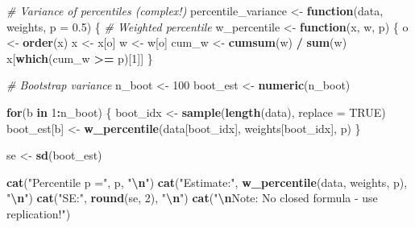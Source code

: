 \documentclass[
]{article}
\newenvironment{Shaded}{\begin{snugshade}}{\end{snugshade}}
\newcommand{\AttributeTok}[1]{\textcolor[rgb]{0.13,0.29,0.53}{#1}}
\newcommand{\CommentTok}[1]{\textcolor[rgb]{0.56,0.35,0.01}{\textit{#1}}}
\newcommand{\ConstantTok}[1]{\textcolor[rgb]{0.56,0.35,0.01}{#1}}
\newcommand{\ControlFlowTok}[1]{\textcolor[rgb]{0.13,0.29,0.53}{\textbf{#1}}}
\newcommand{\DecValTok}[1]{\textcolor[rgb]{0.00,0.00,0.81}{#1}}
\newcommand{\FloatTok}[1]{\textcolor[rgb]{0.00,0.00,0.81}{#1}}
\newcommand{\FunctionTok}[1]{\textcolor[rgb]{0.13,0.29,0.53}{\textbf{#1}}}
\newcommand{\NormalTok}[1]{#1}
\newcommand{\OtherTok}[1]{\textcolor[rgb]{0.56,0.35,0.01}{#1}}
\newcommand{\SpecialCharTok}[1]{\textcolor[rgb]{0.81,0.36,0.00}{\textbf{#1}}}
\newcommand{\StringTok}[1]{\textcolor[rgb]{0.31,0.60,0.02}{#1}}
\begin{document}
\begin{Shaded}
\begin{Highlighting}[]
\CommentTok{\# Variance of percentiles (complex!)}
\NormalTok{percentile\_variance }\OtherTok{\textless{}{-}} \ControlFlowTok{function}\NormalTok{(data, weights, }\AttributeTok{p =} \FloatTok{0.5}\NormalTok{) \{}
  \CommentTok{\# Weighted percentile}
\NormalTok{  w\_percentile }\OtherTok{\textless{}{-}} \ControlFlowTok{function}\NormalTok{(x, w, p) \{}
\NormalTok{    o }\OtherTok{\textless{}{-}} \FunctionTok{order}\NormalTok{(x)}
\NormalTok{    x }\OtherTok{\textless{}{-}}\NormalTok{ x[o]}
\NormalTok{    w }\OtherTok{\textless{}{-}}\NormalTok{ w[o]}
\NormalTok{    cum\_w }\OtherTok{\textless{}{-}} \FunctionTok{cumsum}\NormalTok{(w) }\SpecialCharTok{/} \FunctionTok{sum}\NormalTok{(w)}
\NormalTok{    x[}\FunctionTok{which}\NormalTok{(cum\_w }\SpecialCharTok{\textgreater{}=}\NormalTok{ p)[}\DecValTok{1}\NormalTok{]]}
\NormalTok{  \}}
  
  \CommentTok{\# Bootstrap variance}
\NormalTok{  n\_boot }\OtherTok{\textless{}{-}} \DecValTok{100}
\NormalTok{  boot\_est }\OtherTok{\textless{}{-}} \FunctionTok{numeric}\NormalTok{(n\_boot)}
  
  \ControlFlowTok{for}\NormalTok{(b }\ControlFlowTok{in} \DecValTok{1}\SpecialCharTok{:}\NormalTok{n\_boot) \{}
\NormalTok{    boot\_idx }\OtherTok{\textless{}{-}} \FunctionTok{sample}\NormalTok{(}\FunctionTok{length}\NormalTok{(data), }\AttributeTok{replace =} \ConstantTok{TRUE}\NormalTok{)}
\NormalTok{    boot\_est[b] }\OtherTok{\textless{}{-}} \FunctionTok{w\_percentile}\NormalTok{(data[boot\_idx], }
\NormalTok{                                weights[boot\_idx], p)}
\NormalTok{  \}}
  
\NormalTok{  se }\OtherTok{\textless{}{-}} \FunctionTok{sd}\NormalTok{(boot\_est)}
  
  \FunctionTok{cat}\NormalTok{(}\StringTok{"Percentile p ="}\NormalTok{, p, }\StringTok{"}\SpecialCharTok{\textbackslash{}n}\StringTok{"}\NormalTok{)}
  \FunctionTok{cat}\NormalTok{(}\StringTok{"Estimate:"}\NormalTok{, }\FunctionTok{w\_percentile}\NormalTok{(data, weights, p), }\StringTok{"}\SpecialCharTok{\textbackslash{}n}\StringTok{"}\NormalTok{)}
  \FunctionTok{cat}\NormalTok{(}\StringTok{"SE:"}\NormalTok{, }\FunctionTok{round}\NormalTok{(se, }\DecValTok{2}\NormalTok{), }\StringTok{"}\SpecialCharTok{\textbackslash{}n}\StringTok{"}\NormalTok{)}
  \FunctionTok{cat}\NormalTok{(}\StringTok{"}\SpecialCharTok{\textbackslash{}n}\StringTok{Note: No closed formula {-} use replication!"}\NormalTok{)}
  

\end{Highlighting}
\end{Shaded}
\end{document}
